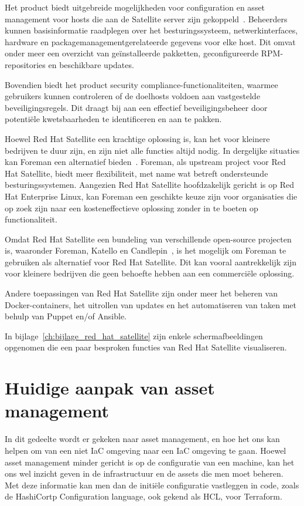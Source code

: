 Het product biedt uitgebreide mogelijkheden voor configuration en asset management voor hosts die aan de Satellite server zijn gekoppeld~\autocite{rhel-satellite-hosts}.
Beheerders kunnen basisinformatie raadplegen over het besturingssysteem, netwerkinterfaces, hardware en packagemanagementgerelateerde gegevens voor elke host.
Dit omvat onder meer een overzicht van ge\"installeerde pakketten, geconfigureerde RPM-repositories en beschikbare updates.

Bovendien biedt het product security compliance-functionaliteiten, waarmee gebruikers kunnen controleren of de doelhosts voldoen aan vastgestelde beveiligingsregels.
Dit draagt bij aan een effectief beveiligingsbeheer door potenti\"ele kwetsbaarheden te identificeren en aan te pakken.

Hoewel Red Hat Satellite een krachtige oplossing is, kan het voor kleinere bedrijven te duur zijn, en zijn niet alle functies altijd nodig.
In dergelijke situaties kan Foreman een alternatief bieden~\autocite{foreman-introduction}.
Foreman, als upstream project voor Red Hat Satellite, biedt meer flexibiliteit, met name wat betreft ondersteunde besturingssystemen.
Aangezien Red Hat Satellite hoofdzakelijk gericht is op Red Hat Enterprise Linux, kan Foreman een geschikte keuze zijn voor organisaties die op zoek zijn naar een kosteneffectieve oplossing zonder in te boeten op functionaliteit.

Omdat Red Hat Satellite een bundeling van verschillende open-source projecten is, waaronder Foreman, Katello en Candlepin~\autocite{rhel-satellite-6-introduction}, is het mogelijk om Foreman te gebruiken als alternatief voor Red Hat Satellite.
Dit kan vooral aantrekkelijk zijn voor kleinere bedrijven die geen behoefte hebben aan een commerci\"ele oplossing.

Andere toepassingen van Red Hat Satellite zijn onder meer het beheren van Docker-containers, het uitrollen van updates en het automatiseren van taken met behulp van Puppet en/of Ansible.

In bijlage~\ref{ch:bijlage_red_hat_satellite} zijn enkele schermafbeeldingen opgenomen die een paar besproken functies van Red Hat Satellite visualiseren.

\section{Huidige aanpak van asset management}%
\label{sec:huidige-aanpak-van-asset-management}

In dit gedeelte wordt er gekeken naar asset management, en hoe het ons kan helpen om van een niet IaC omgeving naar een IaC omgeving te gaan.
Hoewel asset management minder gericht is op de configuratie van een machine, kan het ons wel inzicht geven in de infrastructuur en de assets die men moet beheren.
Met deze informatie kan men dan de initi\"ele configuratie vastleggen in code, zoals de HashiCortp Configuration language, ook gekend als HCL, voor Terraform.

